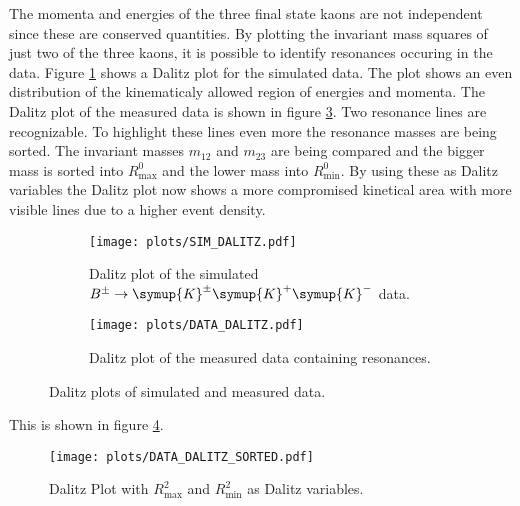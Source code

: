 The momenta and energies of the three final state kaons are not independent since these are conserved quantities.
By plotting the invariant mass squares of just two of the three kaons, it is possible to identify resonances occuring in the data.
Figure \ref{fig:DalitzSim} shows a Dalitz plot for the simulated data.
The plot shows an even distribution of the kinematicaly allowed region of energies and momenta.
The Dalitz plot of the measured data is shown in figure \ref{fig:DalitzData}.
Two resonance lines are recognizable.
To highlight these lines even more the resonance masses are being sorted.
The invariant masses $m_{12}$ and $m_{23}$ are being compared and the bigger mass is sorted into $R^0_\text{max}$ and the lower mass into $R^0_\text{min}$.
By using these as Dalitz variables the Dalitz plot now shows a more compromised kinetical area with more visible lines due to a higher event density.

\begin{figure}[!htb]
\centering
\begin{subfigure}{0.49\textwidth}
  \texttt{[image: plots/SIM\_DALITZ.pdf]}
  \caption{Dalitz plot of the simulated $B^{\pm} \to \symup{K}^{\pm} \symup{K}^{+} \symup{K}^{-}$ data.}
  \label{fig:DalitzSim}
\end{subfigure}
\begin{subfigure}{0.49\textwidth}
  \texttt{[image: plots/DATA\_DALITZ.pdf]}
  \caption{Dalitz plot of the measured data containing resonances.}
  \label{fig:DalitzData}
\end{subfigure}
\caption{Dalitz plots of simulated and measured data.}
\end{figure}
This is shown in figure \ref{fig:Sorted}.

\begin{figure}[!htb]
  \centering
  \texttt{[image: plots/DATA\_DALITZ\_SORTED.pdf]}
  \caption{Dalitz Plot with $R^2_\text{max}$ and $R^2_\text{min}$ as Dalitz variables.}
  \label{fig:Sorted}
\end{figure}

